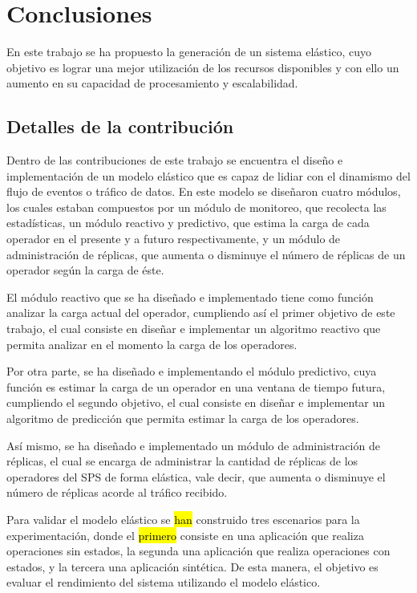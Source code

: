 \chapter{Conclusiones}
\label{cap:conclusiones}
En este trabajo se ha propuesto la generación de un sistema elástico, cuyo objetivo es lograr una mejor utilización de los recursos disponibles y con ello un aumento en su capacidad de procesamiento y escalabilidad.

\section{Detalles de la contribución}
Dentro de las contribuciones de este trabajo se encuentra el diseño e implementación de un modelo elástico que es capaz de lidiar con el dinamismo del flujo de eventos o tráfico de datos. En este modelo se diseñaron cuatro módulos, los cuales estaban compuestos por un módulo de monitoreo, que recolecta las estadísticas, un módulo reactivo y predictivo, que estima la carga de cada operador en el presente y a futuro respectivamente, y un módulo de administración de réplicas, que aumenta o disminuye el número de réplicas de un operador según la carga de éste.

El módulo reactivo que se ha diseñado e implementado tiene como función analizar la carga actual del operador, cumpliendo así el primer objetivo de este trabajo, el cual consiste en dise\~nar e implementar un algoritmo reactivo que permita analizar en el momento la carga de los operadores.

Por otra parte, se ha diseñado e implementando el módulo predictivo, cuya función es estimar la carga de un operador en una ventana de tiempo futura, cumpliendo el segundo objetivo, el cual consiste en dise\~nar e implementar un algoritmo de predicci\'on que permita estimar la carga de los operadores.

Así mismo, se ha diseñado e implementado un módulo de administración de réplicas, el cual se encarga de administrar la cantidad de réplicas de los operadores del SPS de forma elástica, vale decir, que aumenta o disminuye el número de réplicas acorde al tráfico recibido.


Para validar el modelo elástico se \hl{han} construido tres escenarios para la experimentación, donde el \hl{primero} consiste en una aplicación que realiza operaciones sin estados, la segunda una aplicación que realiza operaciones con estados, y la tercera una aplicación sintética. De esta manera, el objetivo es evaluar el rendimiento del sistema utilizando el modelo elástico.

